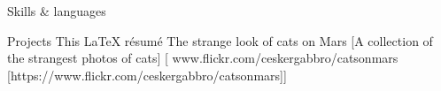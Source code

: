 \documentclass{llresume}
\begin{document}
\begin{mainpane}
    \begin{mainsection}{Skills \& languages}
    \end{mainsection}

    
    \begin{mainsection}{Projects}
        \entryGeneric
            {This LaTeX r\'esum\'e}
        \entryGeneric
            {The strange look of cats on Mars}
            [A collection of the strangest photos of cats]
            [\infoFlickr
                {www.flickr.com/ceskergabbro/catsonmars}
                [https://www.flickr.com/ceskergabbro/catsonmars]]
    \end{mainsection} 

    
\end{mainpane}
\end{document}

